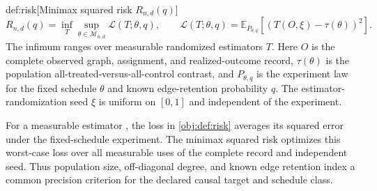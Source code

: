 \begin{definitionv}{def:risk}[Minimax squared risk $R_{n,d}(q)$]
\[
R_{n,d}(q)
=
\inf_T\sup_{\theta\in\mathcal M_{n,d}}\mathcal L(T;\theta,q),
\qquad
\mathcal L(T;\theta,q)
=
\mathbb E_{P_{\theta,q}}
\left[(T(O,\xi)-\tau(\theta))^2\right].
\]
The infimum ranges over measurable randomized estimators \(T\). Here \(O\) is the complete observed graph, assignment, and realized-outcome record, \(\tau(\theta)\) is the population all-treated-versus-all-control contrast, and \(P_{\theta,q}\) is the experiment law for the fixed schedule \(\theta\) and known edge-retention probability \(q\). The estimator-randomization seed \(\xi\) is uniform on \([0,1]\) and independent of the experiment.
\end{definitionv}

For a measurable estimator , the loss  in \cref{obj:def:risk} averages its squared error under the fixed-schedule experiment. The minimax squared risk  optimizes this worst-case loss over all measurable uses of the complete record and independent seed. Thus population size, off-diagonal degree, and known edge retention index a common precision criterion for the declared causal target and schedule class.
